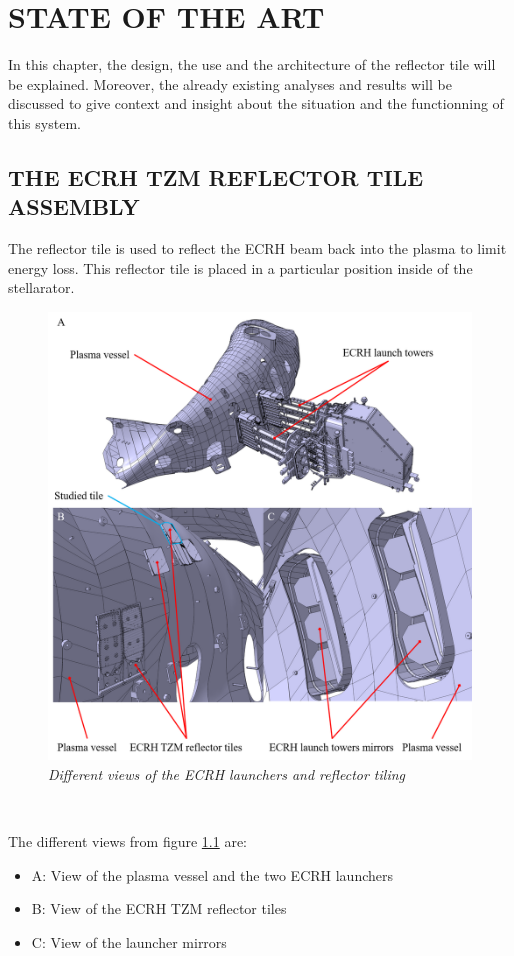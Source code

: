 \chapter{STATE OF THE ART}
\normalsize{In this chapter, the design, the use and the architecture of the reflector tile will be explained. Moreover, the already existing analyses and results will be discussed to give context and insight about the situation and the functionning of this system.}
\section{THE \acrshort{ECRH} \acrshort{TZM} REFLECTOR TILE ASSEMBLY} \label{chapter:3.1}
\normalsize{The reflector tile is used to reflect the \acrshort{ECRH} beam back into the plasma to limit energy loss. This reflector tile is placed in a particular position inside of the stellarator.}
\begin{figure}[h!]
    \centering
    \includegraphics[width=1\textwidth]{figures/ecrhposition2.png}
    \caption{\it Different views of the \acrshort{ECRH} launchers and reflector tiling}
    \label{fig:fig_3_1}
\end{figure}
\\
\normalsize{The different views from figure \ref{fig:fig_3_1} are:
\begin{itemize}
    \item A: View of the plasma vessel and the two \acrshort{ECRH} launchers
    \item B: View of the \acrshort{ECRH} \acrshort{TZM} reflector tiles
    \item C: View of the launcher mirrors
\end{itemize}
}
